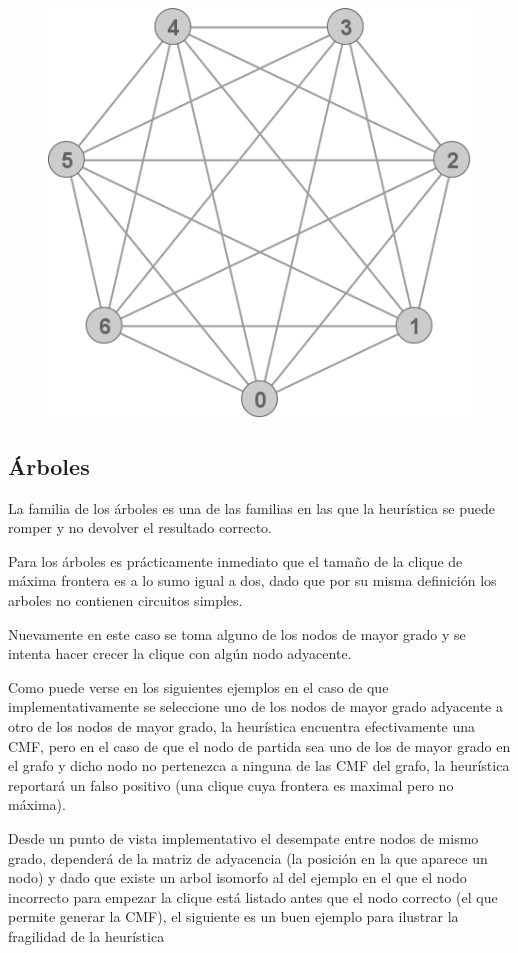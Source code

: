 \begin{figure}[H]
\includegraphics[scale = 0.5]{img/ej3/constructiva_golosa/K7_st0.png}
\end{figure}

\subsection{\'Arboles}
La familia de los \'arboles es una de las familias en las que la heur\'istica
se puede romper y no devolver el resultado correcto. 

Para los \'arboles es pr\'acticamente inmediato que el 
tama\~no de la clique de m\'axima frontera es a lo sumo igual a dos, dado
que por su misma definici\'on los arboles no contienen circuitos simples.

Nuevamente en este caso se toma alguno de los nodos de mayor grado 
y se intenta hacer crecer la clique con alg\'un nodo adyacente.

Como puede verse en los siguientes ejemplos en el caso de que 
implementativamente se seleccione uno de los nodos de mayor grado
adyacente a otro de los nodos de mayor grado, la heur\'istica encuentra
efectivamente una CMF, pero en el caso de que el nodo de partida sea 
uno de los de mayor grado en el grafo y dicho nodo no pertenezca a
ninguna de las CMF del grafo, la heur\'istica reportar\'a un falso 
positivo (una clique cuya frontera es maximal pero no m\'axima).

Desde un punto de vista implementativo el desempate entre nodos de 
mismo grado, depender\'a de la matriz de adyacencia (la posici\'on en
la que aparece un nodo) y dado que existe un arbol isomorfo al del 
ejemplo en el que el nodo incorrecto para empezar la clique est\'a
listado antes que el nodo correcto (el que permite generar la CMF),
el siguiente es un buen ejemplo para ilustrar la fragilidad de la
heur\'istica

